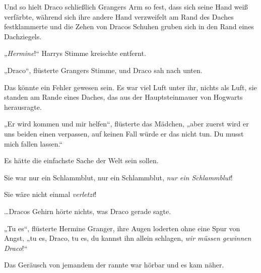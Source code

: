 Und so hielt Draco schließlich Grangers Arm so fest, dass sich seine Hand weiß verfärbte, während sich ihre andere Hand verzweifelt am Rand des Daches festklammerte und die Zehen von Dracos Schuhen gruben sich in den Rand eines Dachziegels.

„\emph{Hermine}!“ Harrys Stimme kreischte entfernt.

„Draco“, flüsterte Grangers Stimme, und Draco sah nach unten.

Das könnte ein Fehler gewesen sein. Es war viel Luft unter ihr, nichts als Luft, sie standen am Rande eines Daches, das aus der Hauptsteinmauer von Hogwarts herausragte.

„Er wird kommen und mir helfen“, flüsterte das Mädchen, „aber zuerst wird er uns beiden einen  verpassen, auf keinen Fall würde er das nicht tun. Du musst mich fallen lassen.“

Es hätte die einfachste Sache der Welt sein sollen.

Sie war nur ein Schlammblut, nur ein Schlammblut, \emph{nur ein Schlammblut}!

Sie wäre nicht einmal \emph{verletzt}!

…Dracos Gehirn hörte nichts, was Draco gerade sagte.

„Tu es“, flüsterte Hermine Granger, ihre Augen loderten ohne eine Spur von Angst, „tu es, Draco, tu es, du kannst ihn allein schlagen, \emph{wir müssen gewinnen Draco}!“

Das Geräusch von jemandem der rannte war hörbar und es kam näher.

